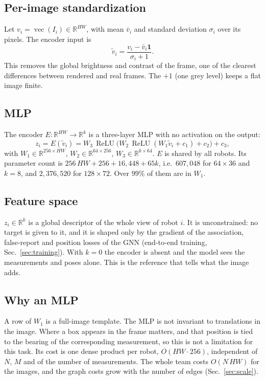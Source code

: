 \documentclass[conference]{IEEEtran}
\newcommand{\R}{\mathbb{R}}
\newcommand{\relu}{\operatorname{ReLU}}
\newcommand{\vect}{\operatorname{vec}}
\begin{document}
\subsection{Per-image standardization}
Let $v_i=\vect(I_i)\in\R^{HW}$, with mean $\bar v_i$ and standard deviation $\sigma_i$ over its pixels. The encoder
input is
\begin{equation}
\tilde v_i=\frac{v_i-\bar v_i\mathbf 1}{\sigma_i+1}.
\end{equation}
This removes the global brightness and contrast of the frame, one of the clearest differences between rendered and
real frames. The $+1$ (one grey level) keeps a flat image finite.

\subsection{MLP}
The encoder $E:\R^{HW}\to\R^{k}$ is a three-layer MLP with no activation on the output:
\begin{equation}
z_i=E(\tilde v_i)=W_3\,\relu\bigl(W_2\,\relu(W_1\tilde v_i+c_1)+c_2\bigr)+c_3,
\end{equation}
with $W_1\in\R^{256\times HW}$, $W_2\in\R^{64\times256}$, $W_3\in\R^{k\times64}$. $E$ is shared by all robots.
Its parameter count is $256\,HW+256+16{,}448+65k$, i.e.\ $607{,}048$ for
$64\times36$ and $k=8$, and $2{,}376{,}520$ for $128\times72$. Over $99\%$ of them are in $W_1$.

\subsection{Feature space}
$z_i\in\R^k$ is a global descriptor of the whole view of robot $i$. It is unconstrained: no target is given to it,
and it is shaped only by the gradient of the association, false-report and position losses of the GNN (end-to-end
training, Sec.~\ref{sec:training}). With $k=0$ the encoder is absent and the model sees the measurements and poses
alone. This is the reference that tells what the image adds.

\subsection{Why an MLP}
A row of $W_1$ is a full-image template. The MLP is not invariant to translations in the image. Where a box appears
in the frame matters, and that position is tied to the bearing of the corresponding measurement, so this is not
a limitation for this task. Its cost is one dense product per robot, $O(HW\cdot256)$, independent of $N$, $M$ and of
the number of measurements. The whole team costs $O(N\,HW)$ for the images, and the graph costs grow with the
number of edges (Sec.~\ref{sec:scale}).
\end{document}
